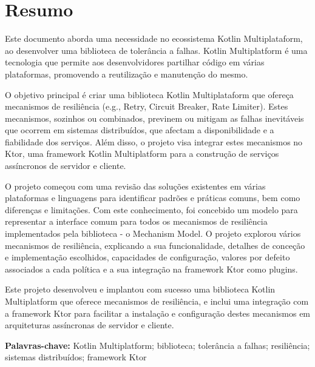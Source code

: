 \chapter*{Resumo}\label{ch:resumo}

Este documento aborda uma necessidade no ecossistema Kotlin Multiplataform,
ao desenvolver uma biblioteca de tolerância a falhas.
Kotlin Multiplatform é uma tecnologia que permite aos desenvolvidores partilhar código em várias plataformas, promovendo a reutilização e manutenção do mesmo.

O objetivo principal é
criar uma biblioteca Kotlin Multiplataform
que ofereça mecanismos de resiliência (e.g., Retry, Circuit Breaker, Rate Limiter).
Estes mecanismos, sozinhos ou combinados, previnem ou mitigam as falhas inevitáveis que ocorrem em sistemas distribuídos,
que afectam a disponibilidade e a fiabilidade dos serviços.
Além disso, o projeto visa integrar estes mecanismos no Ktor,
uma framework Kotlin Multiplatform para a construção de serviços assíncronos de servidor e cliente.

O projeto começou com uma revisão das soluções existentes em várias plataformas e linguagens para identificar padrões e práticas comuns, bem como diferenças e limitações.
Com este conhecimento, foi concebido um modelo para representar a interface comum para todos os mecanismos de resiliência implementados pela biblioteca - o Mechanism Model.
O projeto explorou vários mecanismos de resiliência,
explicando a sua funcionalidade,
detalhes de conceção e implementação escolhidos, capacidades de configuração, valores por defeito associados a cada política e a sua integração na framework Ktor como plugins.

Este projeto desenvolveu e implantou com sucesso uma biblioteca Kotlin Multiplatform que oferece mecanismos de resiliência,
e inclui uma integração com a framework Ktor para facilitar a instalação e configuração destes mecanismos em arquiteturas assíncronas de servidor e cliente.


\textbf{Palavras-chave:} Kotlin Multiplatform; biblioteca; tolerância a falhas; resiliência; sistemas distribuídos; framework Ktor
